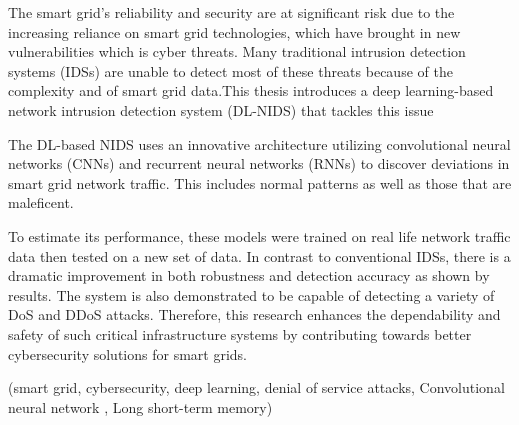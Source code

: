 \begin{abstractEn}
	

	The smart grid's reliability and security are at significant risk due to the increasing reliance on smart grid technologies, which have brought in new vulnerabilities which is cyber threats. Many traditional intrusion detection systems (IDSs) are unable to detect most of these threats because of the complexity and  of smart grid data.This thesis introduces a deep learning-based network intrusion detection system (DL-NIDS) that tackles this issue

	The DL-based NIDS uses an innovative architecture utilizing convolutional neural networks (CNNs) and recurrent neural networks (RNNs) to discover deviations in smart grid network traffic. This includes normal patterns as well as those that are maleficent.

	To estimate its performance, these models were trained on real life network traffic data then tested on a new set of data. In contrast to conventional IDSs, there is a dramatic improvement in both robustness and detection accuracy as shown by results. The system is also demonstrated to be capable of detecting a variety of DoS and DDoS attacks. Therefore, this research enhances the dependability and safety of such critical infrastructure systems by contributing towards better cybersecurity solutions for smart grids.


\end{abstractEn}

\begin{keywordsEn}
	(smart grid, cybersecurity, deep learning, denial of service attacks, Convolutional neural network , Long short-term memory)
\end{keywordsEn}



\newpage
